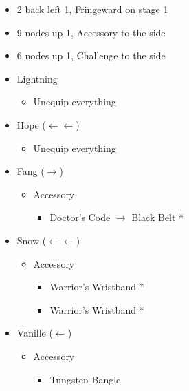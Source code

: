 \begin{menu}
\begin{multicols}{2}
\begin{itemize}
\begin{itemize}
\begin{itemize}
					            \begin{itemize}
						            \item 2 back left 1, Fringeward on stage 1
						            \item 9 nodes up 1, Accessory to the side
						            \item 6 nodes up 1, Challenge to the side
					            \end{itemize}
				      \end{itemize}
			\end{itemize}
			\columnbreak
			\equip
			\begin{itemize}
				\item Lightning
				      \begin{itemize}
					      \item Unequip everything
				      \end{itemize}
				\item Hope ($\leftarrow\leftarrow$)
				      \begin{itemize}
					      \item Unequip everything
				      \end{itemize}
				\item Fang ($\rightarrow$)
				      \begin{itemize}
					      \item Accessory
					            \begin{itemize}
						            \item Doctor's Code $\rightarrow$ Black Belt *
					            \end{itemize}
				      \end{itemize}
				\item Snow ($\leftarrow\leftarrow$)
				      \begin{itemize}
					      \item Accessory
					            \begin{itemize}
						            \item Warrior's Wristband *
						            \item Warrior's Wristband *
					            \end{itemize}
				      \end{itemize}
				\item Vanille ($\leftarrow$)
				      \begin{itemize}
					      \item Accessory
					            \begin{itemize}
						            \item Tungsten Bangle

\end{itemize}
\end{itemize}
\end{itemize}
\end{itemize}
\end{multicols}
\end{menu}
